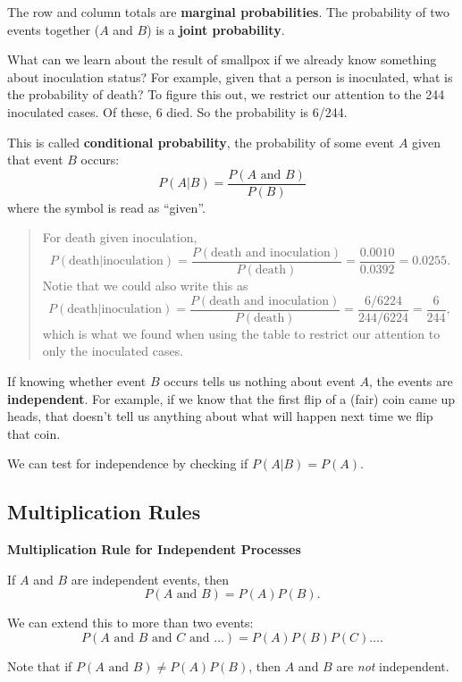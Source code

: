 \documentclass[
]{book}
\begin{document}
The row and column totals are \textbf{marginal probabilities}. The probability of two events together (\(A\) and \(B\)) is a \textbf{joint probability}.

What can we learn about the result of smallpox if we already know something about inoculation status? For example, given that a person is inoculated, what is the probability of death? To figure this out, we restrict our attention to the 244 inoculated cases. Of these, 6 died. So the probability is 6/244.

This is called \textbf{conditional probability}, the probability of some event \(A\) given that event \(B\) occurs: \[P(A|B) = \frac{P(A\text{ and }B)}{P(B)}\] where the symbol \textbar{} is read as ``given''.

\begin{quote}
For death given inoculation, \[P(\text{death}|\text{inoculation}) = \frac{P(\text{death and inoculation})}{P(\text{death})} = \frac{0.0010}{0.0392} = 0.0255.\]
Notie that we could also write this as \[P(\text{death}|\text{inoculation}) = \frac{P(\text{death and inoculation})}{P(\text{death})} = \frac{6/6224}{244/6224} = \frac{6}{244},\] which is what we found when using the table to restrict our attention to only the inoculated cases.
\end{quote}

If knowing whether event \(B\) occurs tells us nothing about event \(A\), the events are \textbf{independent}. For example, if we know that the first flip of a (fair) coin came up heads, that doesn't tell us anything about what will happen next time we flip that coin.

We can test for independence by checking if \(P(A|B)=P(A)\).

\hypertarget{multiplication-rules}{%
\subsection{Multiplication Rules}\label{multiplication-rules}}

\textbf{Multiplication Rule for Independent Processes}

If \(A\) and \(B\) are independent events, then \[P(A \text{ and }B) = P(A)P(B).\]

We can extend this to more than two events: \[P(A \text{ and }B \text{ and } C \text{ and } \dots) = P(A)P(B)P(C)\dots.\]

Note that if \(P(A \text{ and }B) \ne P(A)P(B)\), then \(A\) and \(B\) are \emph{not} independent.
\end{document}

